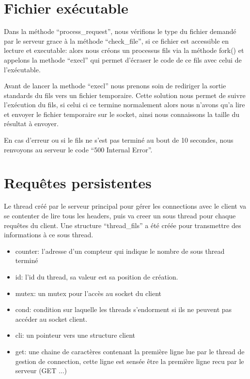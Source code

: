 \documentclass{article}
\begin{document}
\section{Fichier exécutable}

Dans la méthode ``process\_request'', nous vérifions le type du fichier demandé par le serveur grace à la méthode ``check\_file'', si ce fichier est accessible en lecture et executable: alors nous créons un processus fils via la méthode fork() et appelons la methode ``execl'' qui permet d'écraser le code de ce fils avec celui de l'exécutable. \hbox{}

Avant de lancer la methode ``execl'' nous prenons soin de rediriger la sortie standards du fils vers un fichier temporaire. Cette solution nous permet de suivre l'exécution du fils, si celui ci ce termine normalement alors nous n'avons qu'a lire et envoyer le fichier temporaire sur le socket, ainsi nous connaissons la taille du résultat à envoyer.

En cas d'erreur ou si le fils ne s'est pas terminé au bout de 10 secondes, nous renvoyons au serveur le code ``500 Internal Error''.

\section{Requêtes persistentes}

Le thread créé par le serveur principal pour gérer les connections avec le client va se contenter de lire tous les headers, puis va creer un sous thread pour chaque requêtes du client.
Une structure ``thread\_fils'' a été créée pour transmettre des informations à ce sous thread.
\begin{itemize}
\item counter: l'adresse d'un compteur qui indique le nombre de sous thread terminé
\item id: l'id du thread, sa valeur est sa position de création.
\item mutex: un mutex pour l'accès au socket du client
\item cond: condition sur laquelle les threads s'endorment si ils ne peuvent pas accéder
  au socket client.
\item cli: un pointeur vers une structure client
\item get: une chaine de caractères contenant la première ligne lue par le thread de gestion de connection, cette ligne est sensée être la première ligne recu par le serveur (GET ...)
\end{itemize}
\end{document}
